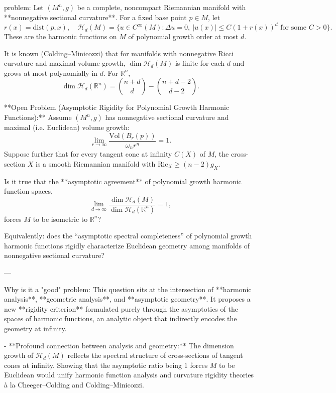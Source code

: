 problem:  
Let \( (M^n, g) \) be a complete, noncompact Riemannian manifold with **nonnegative sectional curvature**.  
For a fixed base point \( p \in M \), let  
\[
r(x) = \mathrm{dist}(p, x), \quad
\mathcal{H}_d(M) = \{ u \in C^\infty(M) : \Delta u = 0,\ |u(x)| \le C(1+r(x))^d \text{ for some } C>0 \}.
\]
These are the harmonic functions on \(M\) of polynomial growth order at most \(d\).

It is known (Colding–Minicozzi) that for manifolds with nonnegative Ricci curvature and maximal volume growth, \(\dim \mathcal{H}_d(M)\) is finite for each \(d\) and grows at most polynomially in \(d\). For \(\mathbb{R}^n\),
\[
\dim \mathcal{H}_d(\mathbb{R}^n) = \binom{n+d}{d} - \binom{n+d-2}{d-2}.
\]

**Open Problem (Asymptotic Rigidity for Polynomial Growth Harmonic Functions):**  
Assume \( (M^n,g) \) has nonnegative sectional curvature and maximal (i.e. Euclidean) volume growth:
\[
\lim_{r\to\infty} \frac{\mathrm{Vol}(B_r(p))}{\omega_n r^n} = 1.
\]
Suppose further that for every tangent cone at infinity \( C(X) \) of \(M\), the cross-section \(X\) is a smooth Riemannian manifold with \( \mathrm{Ric}_X \ge (n-2)g_X \).

Is it true that the **asymptotic agreement** of polynomial growth harmonic function spaces,
\[
\lim_{d\to\infty} \frac{\dim \mathcal{H}_d(M)}{\dim \mathcal{H}_d(\mathbb{R}^n)} = 1,
\]
forces \( M \) to be isometric to \( \mathbb{R}^n \)?  

Equivalently: does the “asymptotic spectral completeness” of polynomial growth harmonic functions rigidly characterize Euclidean geometry among manifolds of nonnegative sectional curvature?

---

Why is it a "good" problem:  
This question sits at the intersection of **harmonic analysis**, **geometric analysis**, and **asymptotic geometry**. It proposes a new **rigidity criterion** formulated purely through the asymptotics of the spaces of harmonic functions, an analytic object that indirectly encodes the geometry at infinity.  

- **Profound connection between analysis and geometry:**  
  The dimension growth of \(\mathcal{H}_d(M)\) reflects the spectral structure of cross-sections of tangent cones at infinity. Showing that the asymptotic ratio being \(1\) forces \(M\) to be Euclidean would unify harmonic function analysis and curvature rigidity theories à la Cheeger–Colding and Colding–Minicozzi.  

